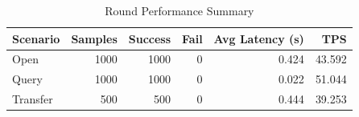 \begin{table}
\caption{Round Performance Summary}
\label{tab:round_perf}
\begin{tabular}{lrrrrr}
\toprule
Scenario & Samples & Success & Fail & Avg Latency (s) & TPS \\
\midrule
Open & 1000 & 1000 & 0 & 0.424 & 43.592 \\
Query & 1000 & 1000 & 0 & 0.022 & 51.044 \\
Transfer & 500 & 500 & 0 & 0.444 & 39.253 \\
\bottomrule
\end{tabular}
\end{table}
